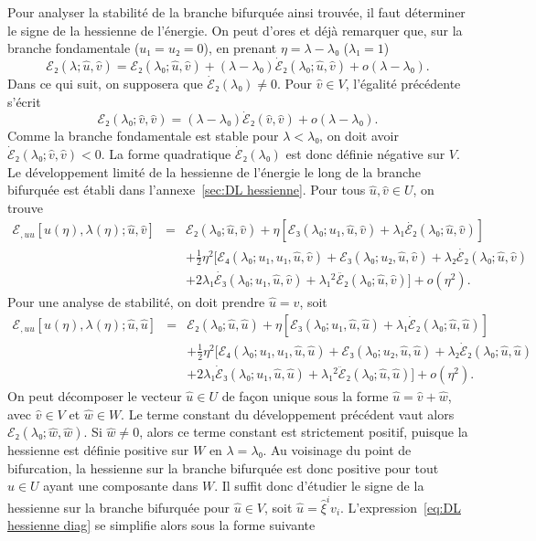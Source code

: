 \documentclass{article}
\begin{document}
Pour analyser la stabilité de la branche bifurquée ainsi trouvée,
il faut déterminer le signe de la hessienne de l'énergie. On peut
d'ores et déjà remarquer que, sur la branche fondamentale ($u₁ = u₂
= 0$), en prenant $η = λ - λ₀$ ($λ₁ = 1$)
\begin{equation}
  ℰ₂ (λ ; \hat{u}, \hat{v}) =ℰ₂ (λ₀ ;
  \hat{u}, \hat{v}) + (λ - λ₀)  \dot{ℰ}₂ (λ₀ ;
  \hat{u}, \hat{v}) + o (λ - λ₀) .
\end{equation}
Dans ce qui suit, on supposera que $\dot{ℰ}₂ (λ₀) \neq 0$.
Pour $\hat{v}∈V$, l'égalité précédente s'écrit
\begin{equation}
  ℰ₂ (λ₀ ; \hat{v}, \hat{v}) = (λ - λ₀)
  \dot{ℰ}₂ (\hat{v}, \hat{v}) + o (λ - λ₀) .
\end{equation}
Comme la branche fondamentale est stable pour $λ < λ₀$, on doit
avoir $\dot{ℰ}₂ (λ₀ ; \hat{v}, \hat{v}) < 0$. La forme
quadratique $\dot{ℰ}₂ (λ₀)$ est donc définie
négative sur $V$. Le développement limité de la hessienne de
l'énergie le long de la branche bifurquée est établi dans
l'annexe~\ref{sec:DL hessienne}. Pour tous $\hat{u}, \hat{v}∈U$, on trouve
\begin{eqnarray}
  ℰ_{, u  u} [u (η), λ (η) ; \hat{u}, \hat{v}] &
  = & ℰ₂ (λ₀ ; \hat{u}, \hat{v}) + η [ℰ₃
  (λ₀ ; u₁, \hat{u}, \hat{v})   + λ₁
  \dot{ℰ₂} (λ₀ ; \hat{u}, \hat{v})] \nonumber\\
  &  &  + \tfrac{1}{2} η^2  [ℰ₄ (λ₀ ; u₁, u₁,
  \hat{u}, \hat{v})  +ℰ₃ (λ₀ ; u₂, \hat{u},
  \hat{v}) + λ₂  \dot{ℰ₂} (λ₀ ; \hat{u}, \hat{v})
  \nonumber\\
  &  &  + 2 λ₁  \dot{ℰ₃} (λ₀ ; u₁,
  \hat{u}, \hat{v}) + λ₁^2  \ddot{ℰ₂} (λ₀ ; \hat{u},
  \hat{v}) ] + o (η^2) .  \label{eq:DL hessienne}
\end{eqnarray}
Pour une analyse de stabilité, on doit prendre $\hat{u} = \hat{v}$, soit
\begin{eqnarray}
  ℰ_{, u  u} [u (η), λ (η) ; \hat{u}, \hat{u}] &
  = & ℰ₂ (λ₀ ; \hat{u}, \hat{u}) + η [ℰ₃
  (λ₀ ; u₁, \hat{u}, \hat{u}) + λ₁  \dot{ℰ}₂
  (λ₀ ; \hat{u}, \hat{u})] \nonumber\\
  &  & + \tfrac{1}{2} η^2  [ℰ₄ (λ₀ ; u₁, u₁, \hat{u},
  \hat{u}) +ℰ₃ (λ₀ ; u₂, \hat{u}, \hat{u}) + λ₂
  \dot{ℰ}₂ (λ₀ ; \hat{u}, \hat{u})  \nonumber\\
  &  & +  2 λ₁  \dot{ℰ}₃ (λ₀ ; u₁,
  \hat{u}, \hat{u}) + λ₁^2  \ddot{ℰ}₂ (λ₀ ; \hat{u},
  \hat{u})] + o (η^2) .  \label{eq:DL hessienne diag}
\end{eqnarray}
On peut décomposer le vecteur $\hat{u}∈U$ de fa{\c c}on unique sous la
forme $\hat{u} = \hat{v} + \hat{w}$, avec $\hat{v}∈V$ et $\hat{w}∈W$.
Le terme constant du développement précédent vaut alors
$ℰ₂ (λ₀ ; \hat{w}, \hat{w})$. Si $\hat{w} \neq 0$, alors ce
terme constant est strictement positif, puisque la hessienne est définie
positive sur $W$ en $λ = λ₀$. Au voisinage du point de
bifurcation, la hessienne sur la branche bifurquée est donc positive pour
tout $\hat{u}∈U$ ayant une composante dans $W$. Il suffit donc
d'étudier le signe de la hessienne sur la branche bifurquée pour
$\hat{u}∈V$, soit $\hat{u} = \hat{ξ}^i v_i$. L'expression~\eqref{eq:DL
hessienne diag} se simplifie alors sous la forme suivante
\end{document}
